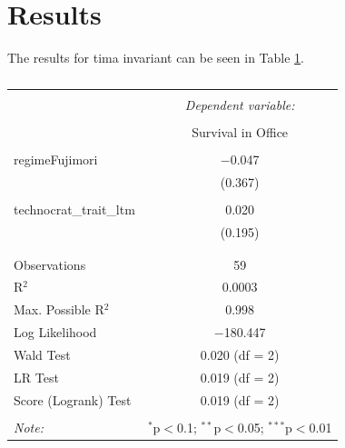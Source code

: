 \documentclass[a4paper, 12pt]{article}
\begin{document}
\section{Results}

The results for tima invariant can be seen in Table \ref{coxInvar}.
\begin{table}[!htbp] \centering 
  \caption{} 
  \label{coxInvar} 
\small 
\begin{tabular}{@{\extracolsep{5pt}}lc} 
\\[-1.8ex]\hline 
\hline \\[-1.8ex] 
 & \multicolumn{1}{c}{\textit{Dependent variable:}} \\ 
\cline{2-2} 
\\[-1.8ex] & Survival in Office \\ 
\hline \\[-1.8ex] 
 regimeFujimori & $-$0.047 \\ 
  & (0.367) \\ 
  & \\ 
 technocrat\_trait\_ltm & 0.020 \\ 
  & (0.195) \\ 
  & \\ 
\hline \\[-1.8ex] 
Observations & 59 \\ 
R$^{2}$ & 0.0003 \\ 
Max. Possible R$^{2}$ & 0.998 \\ 
Log Likelihood & $-$180.447 \\ 
Wald Test & 0.020 (df = 2) \\ 
LR Test & 0.019 (df = 2) \\ 
Score (Logrank) Test & 0.019 (df = 2) \\ 
\hline 
\hline \\[-1.8ex] 
\textit{Note:}  & \multicolumn{1}{r}{$^{*}$p$<$0.1; $^{**}$p$<$0.05; $^{***}$p$<$0.01} \\ 
\end{tabular} 
\end{table} 
\end{document}
